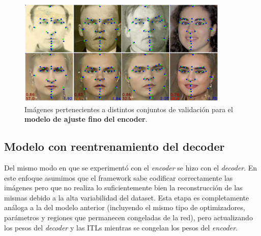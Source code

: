     \begin{figure}[H]
        \centering
        \includegraphics[width=0.9\textwidth]{img/image_encoder.png}
        \caption{Imágenes pertenecientes a distintos conjuntos de validación para el \textbf{modelo de ajuste fino del encoder}.}
        \label{fig:Ejemplo_encoder}
    \end{figure}

    \subsection{Modelo con reentrenamiento del decoder}
        \noindent Del mismo modo en que se experimentó con el \textit{encoder} se hizo con el \textit{decoder}. En este enfoque asumimos que el framework sabe codificar correctamente las imágenes pero que no realiza lo suficientemente bien la reconstrucción de las mismas debido a la alta variabilidad del dataset. Esta etapa es completamente análoga a la del modelo anterior (incluyendo el mismo tipo de optimizadores, parámetros y regiones que permanecen congeladas de la red), pero actualizando los pesos del \textit{decoder} y las ITLs mientras se congelan los pesos del \textit{encoder}.

